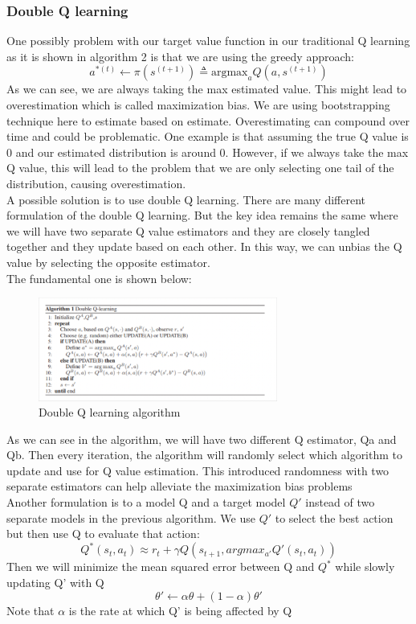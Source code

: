 \documentclass[11pt]{article}
\begin{document}
\subsubsection{Double Q learning}
One possibly problem with our target value function in our traditional Q learning as it is shown in algorithm 2 is that we are using the greedy approach:
$$a^{*(t)} \leftarrow \pi(s^{(t+1)}) \triangleq \text{argmax}_a Q(a,s^{(t+1)})$$
As we can see, we are always taking the max estimated value. This might lead to overestimation which is called maximization bias. We are using bootstrapping technique here to estimate based on estimate. Overestimating can compound over time and could be problematic. One example is that assuming the true Q value is 0 and our estimated distribution is around 0. However, if we always take the max Q value, this will lead to the problem that we are only selecting one tail of the distribution, causing overestimation. \\
A possible solution is to use double Q learning. There are many different formulation of the double Q learning. But the key idea remains the same where we will have two separate Q value estimators and they are closely tangled together and they update based on each other. In this way, we can unbias the Q value by selecting the opposite estimator.\\
The fundamental one is shown below:
\begin{figure}[H]
    \centering
    \includegraphics[width=0.7\textwidth]{images/pic3.png}
    \caption{Double Q learning algorithm}
    \label{fig:DQN}
\end{figure}

As we can see in the algorithm, we will have two different Q estimator, Qa and Qb. Then every iteration, the algorithm will randomly select which algorithm to update and use for Q value estimation. This introduced randomness with two separate estimators can help alleviate the maximization bias problems \\

Another formulation is to a model Q and a target model $Q'$ instead of two separate models in the previous algorithm. We use $Q'$ to select the best action but then use Q to evaluate that action:
$$Q^* (s_t, a_t) \approx r_t + \gamma Q(s_{t+1}, argmax_{a'} Q'{(s_t,a_t)})$$
Then we will minimize the mean squared error between Q and $Q^{*}$ while slowly updating Q' with Q\\
$$\theta' \leftarrow \alpha \theta + (1-\alpha)\theta'$$
Note that $\alpha$ is the rate at which Q' is being affected by Q \\
\end{document}

